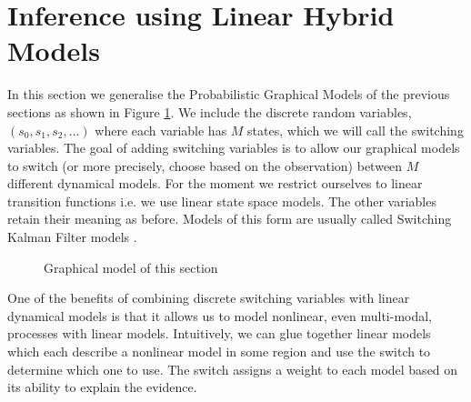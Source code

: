 \section{Inference using Linear Hybrid Models}
In this section we generalise the Probabilistic Graphical Models of the previous sections as shown in Figure \ref{fig_hybridmod1}. We include the discrete random variables, $(s_0,s_1, s_2,...)$ where each variable has $M$ states, which we will call the switching variables. The goal of adding switching variables is to allow our graphical models to switch (or more precisely, choose based on the observation) between $M$ different dynamical models. For the moment we restrict ourselves to linear transition functions i.e. we use linear state space models. The other variables retain their meaning as before. Models of this form are usually called Switching Kalman Filter models \cite{murphy1}. 
\begin{figure}[H] 
\centering
{}
\caption{Graphical model of this section}
\label{fig_hybridmod1}
\end{figure}
One of the benefits of combining discrete switching variables with linear dynamical models is that it allows us to model nonlinear, even multi-modal, processes with linear models. Intuitively, we can glue together linear models which each describe a nonlinear model in some region and use the switch to determine which one to use. The switch assigns a weight to each model based on its ability to explain the evidence. 

